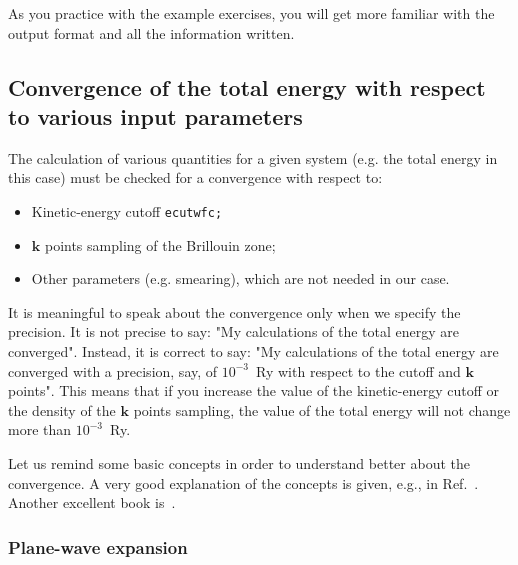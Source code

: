 \documentclass[12pt]{article}
\begin{document}
    As you practice with the example exercises, you will get more familiar with the
    output format and all the information written.


    \subsection{Convergence of the total energy with respect to various input parameters}

      The calculation of various quantities for a given system (e.g. the total energy in this case) must be checked for a convergence with respect to:

      \begin{itemize}
        \item Kinetic-energy cutoff {\tt ecutwfc;}
        \item $\mathbf{k}$ points sampling of the Brillouin zone;
        \item Other parameters (e.g. smearing), which are not needed in our case.
      \end{itemize}

      It is meaningful to speak about the convergence only when we specify the precision. It is not precise to say: "My calculations of the total energy are converged". Instead, it is correct to say: "My calculations of the total energy are converged with a precision, say, of $10^{-3}$~Ry with respect to the cutoff and $\mathbf{k}$ points". This means that if you increase the value of the kinetic-energy cutoff or the density of the $\mathbf{k}$ points sampling, the value of the total energy will not change more than $10^{-3}$~Ry.

      Let us remind some basic concepts in order to understand better about the convergence. A very good explanation of the concepts is given, e.g., in Ref.~\cite{Sholl2011density}. Another excellent book is~\cite{Martin2004electronic}. 


\subsubsection {Plane-wave expansion}
\end{document}
